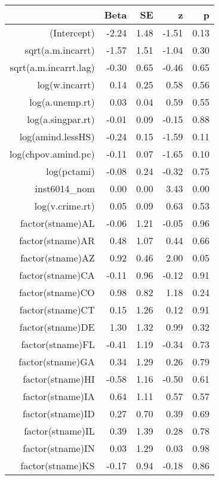 \begin{table}[ht]
\centering
\begin{tabular}{rrrrr}
  \hline
 & Beta & SE & z & p \\ 
  \hline
(Intercept) & -2.24 & 1.48 & -1.51 & 0.13 \\ 
  sqrt(a.m.incarrt) & -1.57 & 1.51 & -1.04 & 0.30 \\ 
  sqrt(a.m.incarrt.lag) & -0.30 & 0.65 & -0.46 & 0.65 \\ 
  log(w.incarrt) & 0.14 & 0.25 & 0.58 & 0.56 \\ 
  log(a.unemp.rt) & 0.03 & 0.04 & 0.59 & 0.55 \\ 
  log(a.singpar.rt) & -0.01 & 0.09 & -0.15 & 0.88 \\ 
  log(amind.lessHS) & -0.24 & 0.15 & -1.59 & 0.11 \\ 
  log(chpov.amind.pc) & -0.11 & 0.07 & -1.65 & 0.10 \\ 
  log(pctami) & -0.08 & 0.24 & -0.32 & 0.75 \\ 
  inst6014\_nom & 0.00 & 0.00 & 3.43 & 0.00 \\ 
  log(v.crime.rt) & 0.05 & 0.09 & 0.63 & 0.53 \\ 
  factor(stname)AL & -0.06 & 1.21 & -0.05 & 0.96 \\ 
  factor(stname)AR & 0.48 & 1.07 & 0.44 & 0.66 \\ 
  factor(stname)AZ & 0.92 & 0.46 & 2.00 & 0.05 \\ 
  factor(stname)CA & -0.11 & 0.96 & -0.12 & 0.91 \\ 
  factor(stname)CO & 0.98 & 0.82 & 1.18 & 0.24 \\ 
  factor(stname)CT & 0.15 & 1.26 & 0.12 & 0.91 \\ 
  factor(stname)DE & 1.30 & 1.32 & 0.99 & 0.32 \\ 
  factor(stname)FL & -0.41 & 1.19 & -0.34 & 0.73 \\ 
  factor(stname)GA & 0.34 & 1.29 & 0.26 & 0.79 \\ 
  factor(stname)HI & -0.58 & 1.16 & -0.50 & 0.61 \\ 
  factor(stname)IA & 0.64 & 1.11 & 0.57 & 0.57 \\ 
  factor(stname)ID & 0.27 & 0.70 & 0.39 & 0.69 \\ 
  factor(stname)IL & 0.39 & 1.39 & 0.28 & 0.78 \\ 
  factor(stname)IN & 0.03 & 1.29 & 0.03 & 0.98 \\ 
  factor(stname)KS & -0.17 & 0.94 & -0.18 & 0.86 \\ 

\end{tabular}
\end{table}
